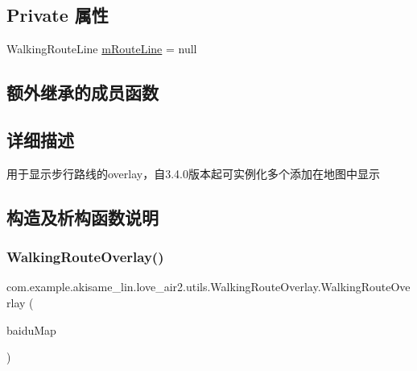 \subsection*{Private 属性}
\begin{DoxyCompactItemize}
\item 
Walking\+Route\+Line \mbox{\hyperlink{classcom_1_1example_1_1akisame__lin_1_1love__air2_1_1utils_1_1_walking_route_overlay_a9ea6b515de10a6ca638f015475f357b8}{m\+Route\+Line}} = null
\end{DoxyCompactItemize}
\subsection*{额外继承的成员函数}


\subsection{详细描述}
用于显示步行路线的overlay，自3.4.\+0版本起可实例化多个添加在地图中显示 

\subsection{构造及析构函数说明}
\mbox{\label{classcom_1_1example_1_1akisame__lin_1_1love__air2_1_1utils_1_1_walking_route_overlay_a8b1c36c3cc467f6e9e734f0984b8d080}} 
\subsubsection{\texorpdfstring{WalkingRouteOverlay()}{WalkingRouteOverlay()}}
{\footnotesize\ttfamily com.\+example.\+akisame\+\_\+lin.\+love\+\_\+air2.\+utils.\+Walking\+Route\+Overlay.\+Walking\+Route\+Overlay (\begin{DoxyParamCaption}\item[{Baidu\+Map}]{baidu\+Map }\end{DoxyParamCaption})\hspace{0.3cm}{\ttfamily [inline]}}



